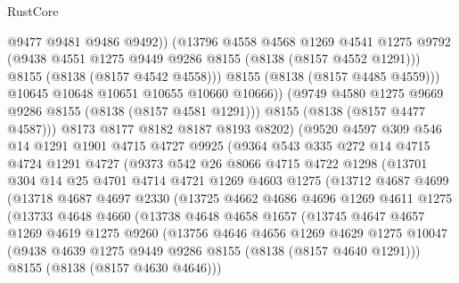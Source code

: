 \begin{lexlean}{RustCore}
\begin{coremodule}
                    @9477
                    @9481
                    @9486
                    @9492))
                (@13796
                  @4558
                  @4568
                  @1269
                  @4541
                  @1275
                  @9792
                  (@9438 @4551 @1275 @9449 @9286 @8155 (@8138 (@8157 @4552 @1291)))
                  @8155
                  (@8138 (@8157 @4542 @4558)))
                @8155
                (@8138 (@8157 @4485 @4559)))
              @10645
              @10648
              @10651
              @10655
              @10660
              @10666))
          (@9749 @4580 @1275 @9669 @9286 @8155 (@8138 (@8157 @4581 @1291)))
          @8155
          (@8138 (@8157 @4477 @4587)))
        @8173
        @8177
        @8182
        @8187
        @8193
        @8202)
      (@9520
        @4597
        @309
        @546
        @14
        @1291
        @1901
        @4715
        @4727
        @9925
        (@9364
          @543
          @335
          @272
          @14
          @4715
          @4724
          @1291
          @4727
          (@9373
            @542
            @26
            @8066
            @4715
            @4722
            @1298
            (@13701
              @304
              @14
              @25
              @4701
              @4714
              @4721
              @1269
              @4603
              @1275
              (@13712
                @4687
                @4699
                (@13718
                  @4687
                  @4697
                  @2330
                  (@13725
                    @4662
                    @4686
                    @4696
                    @1269
                    @4611
                    @1275
                    (@13733
                      @4648
                      @4660
                      (@13738
                        @4648
                        @4658
                        @1657
                        (@13745
                          @4647
                          @4657
                          @1269
                          @4619
                          @1275
                          @9260
                          (@13756
                            @4646
                            @4656
                            @1269
                            @4629
                            @1275
                            @10047
                            (@9438 @4639 @1275 @9449 @9286 @8155 (@8138 (@8157 @4640 @1291)))
                            @8155
                            (@8138 (@8157 @4630 @4646)))

\end{coremodule}
\end{lexlean}
